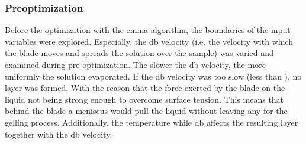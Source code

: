 \subsubsection{Preoptimization}
Before the optimization with the \gls{emma} algorithm, 
the boundaries of the input variables were explored. 
Especially, the \gls{db} velocity (i.e. the velocity with which the blade moves and spreads the solution over the sample)
was varied and examined during pre-optimization. 
The slower the \gls{db} velocity, the more uniformly the solution evaporated. 
If the \gls{db} velocity was too slow (less than ), no layer was formed. 
With the reason that the force exerted by the blade on the liquid not being strong enough to overcome surface tension. 
This means that behind the blade a meniscus would pull the liquid without leaving any for the gelling process. 
Additionally, the temperature while \gls{db} affects the resulting layer together with the \gls{db} velocity. 


